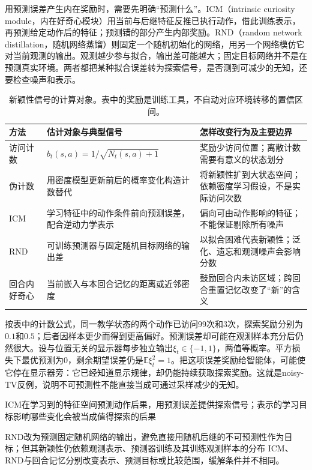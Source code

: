 用预测误差产生内在奖励时，需要先明确“预测什么”。ICM（intrinsic curiosity module，内在好奇心模块）用当前与后继特征反推已执行动作，借此训练表示，再预测给定动作后的特征；预测错的部分产生内部奖励。RND（random network distillation，随机网络蒸馏）则固定一个随机初始化的网络，用另一个网络模仿它对当前观测的输出。观测越少参与拟合，输出差可能越大；固定目标网络并不是在预测真实环境。两者都把某种拟合误差转为探索信号，是否测到可减少的无知，还要检查噪声和表示。

\begin{table}[t]
  \centering
  \small
  \begin{tabularx}{\linewidth}{>{\raggedright\arraybackslash}p{24mm} >{\raggedright\arraybackslash}X >{\raggedright\arraybackslash}X}
    \toprule
    方法 & 估计对象与典型信号 & 怎样改变行为及主要边界 \\
    \midrule
    访问计数 & $b_t(s,a)=1/\sqrt{N_t(s,a)+1}$ & 奖励少访问位置；离散计数需要有意义的状态划分 \\
    伪计数 & 用密度模型更新前后的概率变化构造计数替代 & 将新颖性扩到大状态空间；依赖密度学习假设，不是实际访问次数 \\
    ICM & 学习特征中的动作条件前向预测误差，配合逆动力学表示 & 偏向可由动作影响的特征；不能保证剔除所有噪声 \\
    RND & 可训练预测器与固定随机目标网络的输出差 & 以拟合困难代表新颖性；泛化、遗忘和观测噪声会影响分数 \\
    回合内好奇心 & 当前嵌入与本回合记忆的距离或近邻密度 & 鼓励回合内未访区域；跨回合重置记忆改变了“新”的含义 \\
    \bottomrule
  \end{tabularx}
  \caption{新颖性信号的计算对象。表中的奖励是训练工具，不自动对应环境转移的置信区间。}
  \label{tab:rl-learning-intrinsic}
\end{table}

按表中的计数公式，同一教学状态的两个动作已访问99次和3次，探索奖励分别为$0.1$和$0.5$；后者因样本更少而得到更高偏好。预测误差却可能在观测样本充分后仍然很大。设与位置无关的显示器每步独立输出$\xi_t\in\{-1,1\}$，两值等概率。平方损失下最优预测为0，剩余期望误差仍是$\mathbb E\xi_t^2=1$。把这项误差奖励给智能体，可能使它停在显示器旁：它已经知道显示规律，却仍能持续获取探索奖励。这就是noisy-TV反例，说明不可预测性不能直接当成可通过采样减少的无知。

ICM在学习到的特征空间预测动作后果，用预测误差提供探索信号；表示的学习目标影响哪些变化会被当成值得探索的后果

RND改为预测固定随机网络的输出，避免直接用随机后继的不可预测性作为目标；但其新颖性仍依赖观测表示、预测器训练及其训练观测样本的分布
ICM、RND与回合记忆分别改变表示、预测目标或比较范围，缓解条件并不相同。

